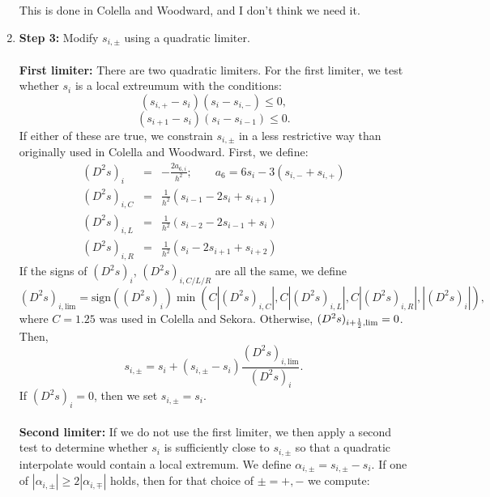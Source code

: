 \begin{enumerate}
This is done in Colella and Woodward, and I don't think we need it.
\item {\bf Step 3:} Modify $s_{i,\pm}$ using a quadratic limiter.\\ \\
{\bf First limiter:} There are two quadratic limiters.  
For the first limiter, we test whether 
$s_i$ is a local extreumum with the conditions:
\begin{equation}
\left(s_{i,+}-s_i\right)\left(s_i-s_{i,-}\right) \le 0,
\end{equation}
\begin{equation}
\left(s_{i+1}-s_{i}\right)\left(s_{i}-s_{i-1}\right) \le 0.
\end{equation}
If either of these are true, we constrain $s_{i,\pm}$ in a less restrictive 
way than originally used in Colella and Woodward.  First, we define:
\begin{eqnarray}
(D^2s)_i &=& -\frac{2a_{6,i}}{h^2}; ~~~~~~~~~ a_6 = 6s_{i} - 3\left(s_{i,-}+s_{i,+}\right) \\
(D^2s)_{i,C} &=& \frac{1}{h^2}\left(s_{i-1}-2s_{i}+s_{i+1}\right) \\
(D^2s)_{i,L} &=& \frac{1}{h^2}\left(s_{i-2}-2s_{i-1}+s_{i}\right) \\
(D^2s)_{i,R} &=& \frac{1}{h^2}\left(s_{i}-2s_{i+1}+s_{i+2}\right)
\end{eqnarray}
If the signs of $(D^2s)_i$, $(D^2s)_{i,C/L/R}$ are all the
same, we define
\begin{equation}
(D^2s)_{i,\text{lim}} = \text{sign}\left((D^2s)_{i}\right)\min\left(C|(D^2s)_{i,C}|,C|(D^2s)_{i,L}|,C|(D^2s)_{i,R}|,|(D^2s)_{i}|\right),
\end{equation}
where $C=1.25$ was used in Colella and Sekora.  Otherwise, 
$(D^2s)_{i+\frac{1}{2},\text{lim}}=0$.  Then,
\begin{equation}
s_{i,\pm} = s_i + \left(s_{i,\pm}-s_{i}\right)\frac{(D^2s)_{i,\text{lim}}}{(D^2s)_i}.
\end{equation}
If $(D^2s)_i=0$, then we set $s_{i,\pm} = s_i$.\\ \\
{\bf Second limiter:} If we do not use the first limiter, we then apply a 
second test to determine 
whether $s_i$ is sufficiently close to $s_{i,\pm}$ so that a quadratic 
interpolate would contain a local extremum.  We define 
$\alpha_{i,\pm} = s_{i,\pm} - s_i$.  If one of $|\alpha_{i,\pm}| \ge 2|\alpha_{i,\mp}|$
holds, then for that choice of $\pm = +,-$ we compute:
\begin{equation}

\end{equation}
\end{enumerate}
